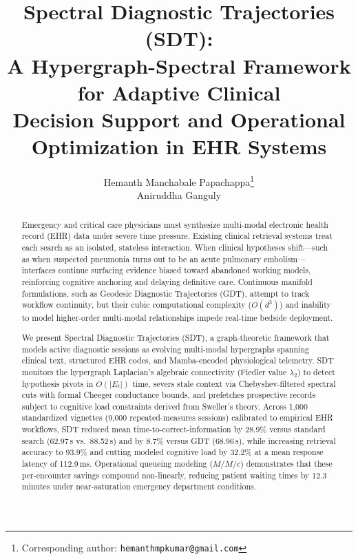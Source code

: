 \documentclass[10pt, onecolumn]{article}
\begin{document}
\title{%
  \textbf{Spectral Diagnostic Trajectories (SDT):}\\[4pt]
  \large A Hypergraph-Spectral Framework for Adaptive Clinical\\
  Decision Support and Operational Optimization in EHR Systems
}

\author{
  Hemanth Manchabale Papachappa\thanks{Corresponding author: \texttt{hemanthmpkumar@gmail.com}} \\
  Aniruddha Ganguly
}

\date{}
\maketitle

\begin{abstract}
\noindent
Emergency and critical care physicians must synthesize multi-modal electronic health record (EHR) data under severe time pressure. Existing clinical retrieval systems treat each search as an isolated, stateless interaction. When clinical hypotheses shift—such as when suspected pneumonia turns out to be an acute pulmonary embolism—interfaces continue surfacing evidence biased toward abandoned working models, reinforcing cognitive anchoring and delaying definitive care. Continuous manifold formulations, such as Geodesic Diagnostic Trajectories (GDT), attempt to track workflow continuity, but their cubic computational complexity ($O(d^3)$) and inability to model higher-order multi-modal relationships impede real-time bedside deployment.

We present Spectral Diagnostic Trajectories (SDT), a graph-theoretic framework that models active diagnostic sessions as evolving multi-modal hypergraphs spanning clinical text, structured EHR codes, and Mamba-encoded physiological telemetry. SDT monitors the hypergraph Laplacian's algebraic connectivity (Fiedler value $\lambda_2$) to detect hypothesis pivots in $O(|E_t|)$ time, severs stale context via Chebyshev-filtered spectral cuts with formal Cheeger conductance bounds, and prefetches prospective records subject to cognitive load constraints derived from Sweller's theory. Across 1{,}000 standardized vignettes (9{,}000 repeated-measures sessions) calibrated to empirical EHR workflows, SDT reduced mean time-to-correct-information by 28.9\% versus standard search (62.97\,s vs.\ 88.52\,s) and by 8.7\% versus GDT (68.96\,s), while increasing retrieval accuracy to 93.9\% and cutting modeled cognitive load by 32.2\% at a mean response latency of 112.9\,ms. Operational queueing modeling ($M/M/c$) demonstrates that these per-encounter savings compound non-linearly, reducing patient waiting times by 12.3 minutes under near-saturation emergency department conditions.
\end{abstract}
\end{document}
